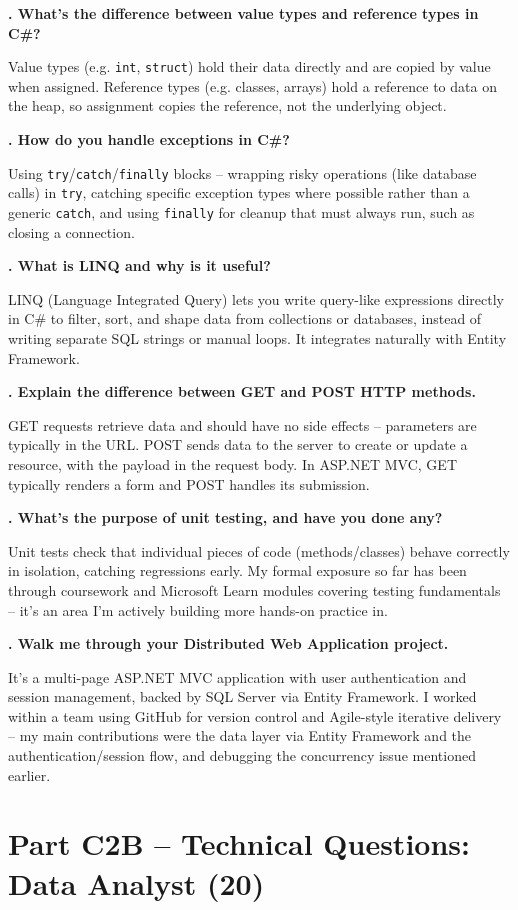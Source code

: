 \documentclass[10.5pt]{article}
\newcounter{qnum}
\newcommand{\resetq}{\setcounter{qnum}{0}}
\newcommand{\qa}[2]{%
  \stepcounter{qnum}%
  \textbf{\theqnum. #1}\par
  #2\par
  \vspace{6pt}
}
\begin{document}
\qa{What's the difference between value types and reference types in C\#?}{Value types (e.g. \texttt{int}, \texttt{struct}) hold their data directly and are copied by value when assigned. Reference types (e.g. classes, arrays) hold a reference to data on the heap, so assignment copies the reference, not the underlying object.}

\qa{How do you handle exceptions in C\#?}{Using \texttt{try}/\texttt{catch}/\texttt{finally} blocks -- wrapping risky operations (like database calls) in \texttt{try}, catching specific exception types where possible rather than a generic \texttt{catch}, and using \texttt{finally} for cleanup that must always run, such as closing a connection.}

\qa{What is LINQ and why is it useful?}{LINQ (Language Integrated Query) lets you write query-like expressions directly in C\# to filter, sort, and shape data from collections or databases, instead of writing separate SQL strings or manual loops. It integrates naturally with Entity Framework.}

\qa{Explain the difference between GET and POST HTTP methods.}{GET requests retrieve data and should have no side effects -- parameters are typically in the URL. POST sends data to the server to create or update a resource, with the payload in the request body. In ASP.NET MVC, GET typically renders a form and POST handles its submission.}

\qa{What's the purpose of unit testing, and have you done any?}{Unit tests check that individual pieces of code (methods/classes) behave correctly in isolation, catching regressions early. My formal exposure so far has been through coursework and Microsoft Learn modules covering testing fundamentals -- it's an area I'm actively building more hands-on practice in.}

\qa{Walk me through your Distributed Web Application project.}{It's a multi-page ASP.NET MVC application with user authentication and session management, backed by SQL Server via Entity Framework. I worked within a team using GitHub for version control and Agile-style iterative delivery -- my main contributions were the data layer via Entity Framework and the authentication/session flow, and debugging the concurrency issue mentioned earlier.}

\newpage
\section{Part C2B -- Technical Questions: Data Analyst (20)}
\resetq
\end{document}
